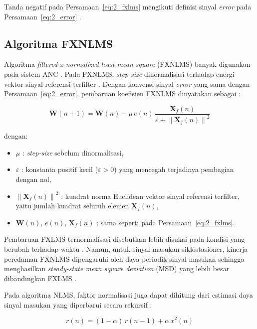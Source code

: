 Tanda negatif pada Persamaan~\eqref{eq:2_fxlms} mengikuti definisi sinyal \emph{error} pada Persamaan~\eqref{eq:2_error} \parencite{zhangrs2023}.

\subsection{Algoritma FXNLMS}
\label{sec:fxnlms}

Algoritma \emph{filtered-x normalized least mean square} (FXNLMS) banyak digunakan pada sistem ANC \parencite{pang2024}. Pada FXNLMS, \emph{step-size} dinormalisasi terhadap energi vektor sinyal referensi terfilter \parencite{li2026,sarkar2025}. Dengan konvensi sinyal \emph{error} yang sama dengan Persamaan~\eqref{eq:2_error}, pembaruan koefisien FXNLMS dinyatakan sebagai \parencite{sarkar2025}:

\begin{equation}
  \label{eq:2_fxnlms}
  \mathbf{W}(n+1) = \mathbf{W}(n) - \mu\,e(n)\,\frac{\mathbf{X}_f(n)}{\varepsilon + \left\|\mathbf{X}_f(n)\right\|^2}
\end{equation}

dengan:
\begin{itemize}[noitemsep, topsep=2pt]
  \item $\mu$ : \emph{step-size} sebelum dinormalisasi,
  \item $\varepsilon$ : konstanta positif kecil ($\varepsilon > 0$) yang mencegah terjadinya pembagian dengan nol,
  \item $\left\|\mathbf{X}_f(n)\right\|^2$ : kuadrat norma Euclidean vektor sinyal referensi terfilter, yaitu jumlah kuadrat seluruh elemen $\mathbf{X}_f(n)$,
  \item $\mathbf{W}(n)$, $e(n)$, $\mathbf{X}_f(n)$ : sama seperti pada Persamaan~\eqref{eq:2_fxlms}.
\end{itemize}

Pembaruan FXLMS ternormalisasi disebutkan lebih disukai pada kondisi yang berubah terhadap waktu \parencite{sarkar2025}. Namun, untuk sinyal masukan siklostasioner, kinerja peredaman FXNLMS dipengaruhi oleh daya periodik sinyal masukan sehingga menghasilkan \emph{steady-state mean square deviation} (MSD) yang lebih besar dibandingkan FXLMS \parencite{pang2024}.

Pada algoritma NLMS, faktor normalisasi juga dapat dihitung dari estimasi daya sinyal masukan yang diperbarui secara rekursif \parencite{arezki2017}:

\begin{equation}
  \label{eq:2_power}
  r(n) = (1-\alpha)\,r(n-1) + \alpha\,x^2(n)
\end{equation}

